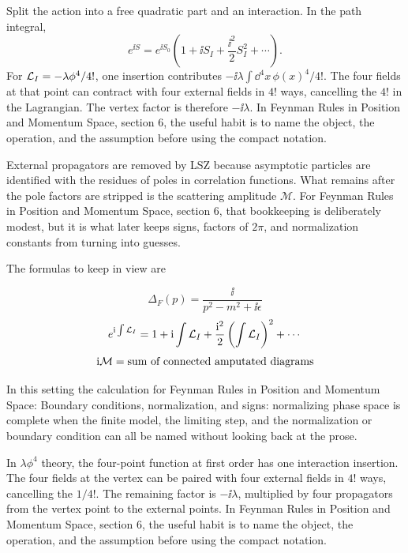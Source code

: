 Split the action into a free quadratic part and an interaction.  In the path integral,
\[
  e^{\ii S}=e^{\ii S_0}\left(1+\ii S_I+\frac{\ii^2}{2}S_I^2+\cdots\right).
\]
For \(\mathcal L_I=-\lambda\phi^4/4!\), one insertion contributes \(-\ii\lambda\int\dd^4x\,\phi(x)^4/4!\).  The four fields at that point can contract with four external fields in \(4!\) ways, cancelling the \(4!\) in the Lagrangian.  The vertex factor is therefore \(-\ii\lambda\).  In Feynman Rules in Position and Momentum Space, section 6, the useful habit is to name the object, the operation, and the assumption before using the compact notation.

External propagators are removed by LSZ because asymptotic particles are identified with the residues of poles in correlation functions.  What remains after the pole factors are stripped is the scattering amplitude \(\mathcal M\).  For Feynman Rules in Position and Momentum Space, section 6, that bookkeeping is deliberately modest, but it is what later keeps signs, factors of \(2\pi\), and normalization constants from turning into guesses.

The formulas to keep in view are

\[
  \Delta_F(p)=\frac{\ii}{p^2-m^2+\ii\epsilon}
\]
\[
  e^{\mathrm i\int\mathcal L_I}=1+\mathrm i\int\mathcal L_I+\frac{\mathrm i^2}{2}\left(\int\mathcal L_I\right)^2+\cdots
\]
\[
  \mathrm i\mathcal M=\hbox{sum of connected amputated diagrams}
\]

In this setting the calculation for Feynman Rules in Position and Momentum Space: Boundary conditions, normalization, and signs: normalizing phase space is complete when the finite model, the limiting step, and the normalization or boundary condition can all be named without looking back at the prose.




\begin{example}
In \(\lambda\phi^4\) theory, the four-point function at first order has one interaction insertion.  The four fields at the vertex can be paired with four external fields in \(4!\) ways, cancelling the \(1/4!\).  The remaining factor is \(-\ii\lambda\), multiplied by four propagators from the vertex point to the external points.  In Feynman Rules in Position and Momentum Space, section 6, the useful habit is to name the object, the operation, and the assumption before using the compact notation.
\end{example}



